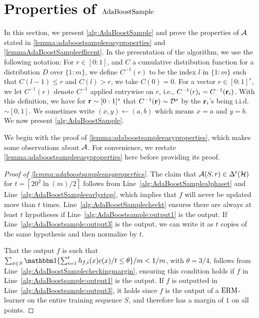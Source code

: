 \section{Properties of $\text{AdaBoostSample }$ }\label{sec:propAdaBoostSample}
In this section, we present \as \cref{alg:AdaBoostSample} and prove the properties of $ \mathcal{A} $  stated in \cref{lemma:adaboostsampleeasyproperties} and \cref{lemmaAdaBoostSampleefficent}. In the presentation of the algorithm, we use the following notation: For $r \in [0:1]$, and $C$ a cumulative distribution function for a distribution $D$ over $\{ 1:m \}$, we define $C^{-1}(r)$ to be the index $l$ in $\{ 1:m \}$ such that $C(l-1)\leq r$  and $C(l)> r$, we take $ C(0)=0 $. For a vector $ r\in [0:1]^{s} $, we let $ C^{-1}(r) $ denote  $ C^{-1} $ applied entrywise on $ r $, i.e., $C^{-1}(r)_{i}=C^{-1}(\mathbf{r}_{i})$. With this definition, we have for $ \mathbf{r}\sim[0:1]^{s} $  that $ C^{-1}(\mathbf{r})\sim \mathcal{D}^{s} $ by the $ \mathbf{r}_{i} $'s being i.i.d. $ \sim[0,1] $. We sometimes write $ (x,y)\gets(a,b) $ which means $ x=a $ and $ y=b $. We now present  \cref{alg:AdaBoostSample}.
\vspace{-0.3cm}
 

We begin with the proof of \cref{lemma:adaboostsampleeasyproperties}, which makes some observations about $ \mathcal{A}$. For convenience, we restate \cref{lemma:adaboostsampleeasyproperties} here before providing its proof. 

\lemmaadaboostsampleeasyproperties*

\begin{proof}[Proof of \cref{lemma:adaboostsampleeasyproperties}]
The claim that $\mathcal{A}(S,r)\in\Delta^{t}(\mathcal{H})$ for $t=\left\lceil20^{2}\ln{(m)}/2\right\rceil$ follows from Line~\ref{alg:AdaBoostSamplealphaset} and Line~\ref{alg:AdaBoostSampleearlystop}, which implies that $f$ will never be updated more than $t$ times. Line~\ref{alg:AdaBoostSamplecheckt} ensures there are always at least $t$ hypotheses if Line~\ref{alg:AdaBoostsample:output1} is the output. If Line~\ref{alg:AdaBoostsample:output3} is the output, we can write it as $t$ copies of the same hypothesis and then normalize by $t$. 

That the output $f$ is such that $\sum_{x\in S} \ind\{\sum_{i=1}^{t} h_{f,i}(x)c(x)/t\leq \theta \}/m <1/m$, with $ \theta=3/4 $,  follows from Line~\ref{alg:AdaBoostSamplecheckingmargin}, ensuring this condition holds if $f$ in Line~\ref{alg:AdaBoostsample:output1} is the output. If $f$ is outputted in Line~\ref{alg:AdaBoostsample:output3}, it holds since $f$ is the output of a $\mathrm{ERM}$-learner on the entire training sequence $S$, and therefore has a margin of $ 1 $ on all points.  
\end{proof}

